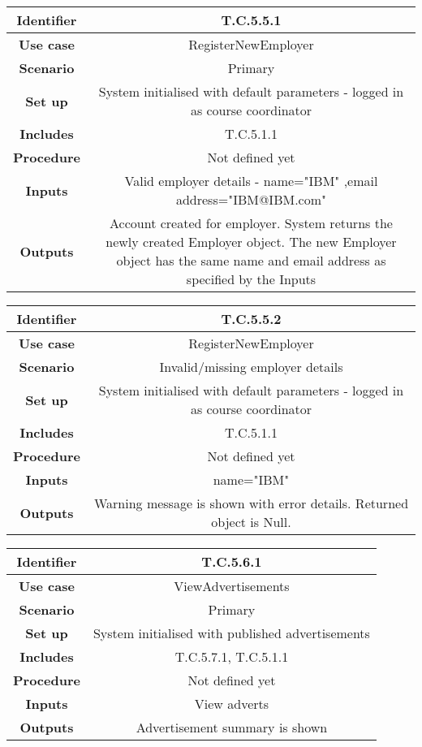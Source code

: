 \begin{tabular}{|c|c|}
\hline \textbf{Identifier} & T.C.5.5.1\\
\hline \textbf{Use case} & RegisterNewEmployer\\
\hline \textbf{Scenario} & Primary\\
\hline \textbf{Set up} & System initialised with default parameters - logged in as course coordinator\\
\hline \textbf{Includes} & T.C.5.1.1\\
\hline \textbf{Procedure} & Not defined yet\\
\hline \textbf{Inputs} & Valid employer details - name="IBM" ,email address="IBM@IBM.com"\\
\hline \textbf{Outputs} & Account created for employer. System returns the newly created Employer object. The new Employer object has the same name and email address as specified by the Inputs\\
\hline
\end{tabular}

\begin{tabular}{|c|c|}
\hline \textbf{Identifier} & T.C.5.5.2\\
\hline \textbf{Use case} & RegisterNewEmployer\\
\hline \textbf{Scenario} & Invalid/missing employer details\\
\hline \textbf{Set up} & System initialised with default parameters - logged in as course coordinator\\
\hline \textbf{Includes} & T.C.5.1.1\\
\hline \textbf{Procedure} & Not defined yet\\
\hline \textbf{Inputs} & name="IBM"\\
\hline \textbf{Outputs} & Warning message is shown with error details. Returned object is Null.\\
\hline
\end{tabular}

\begin{tabular}{|c|c|}
\hline \textbf{Identifier} & T.C.5.6.1\\
\hline \textbf{Use case} & ViewAdvertisements\\
\hline \textbf{Scenario} & Primary\\
\hline \textbf{Set up} & System initialised with published advertisements\\
\hline \textbf{Includes} & T.C.5.7.1, T.C.5.1.1\\
\hline \textbf{Procedure} & Not defined yet\\
\hline \textbf{Inputs} & View adverts\\
\hline \textbf{Outputs} & Advertisement summary is shown\\
\hline
\end{tabular}

